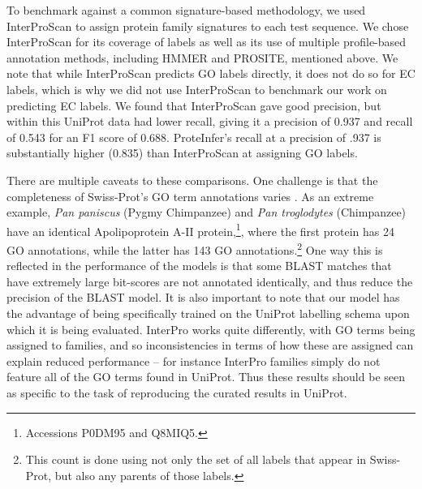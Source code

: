 \DIFaddend To benchmark against a common signature-based methodology, we used InterProScan to assign protein family signatures to each test sequence. We chose InterProScan for its coverage of labels as well as its use of multiple profile-based annotation methods, including HMMER and PROSITE, mentioned above. We note that while InterProScan predicts GO labels directly, it does not do so for EC labels, which is why we did not use InterProScan to benchmark our work on predicting EC labels. We found that InterProScan gave good precision, but within this UniProt data had lower recall, giving it a precision of 0.937 and recall of 0.543 for an F1 score of 0.688. ProteInfer's recall at a precision of .937 is substantially higher (0.835) than InterProScan at assigning GO labels.  

There are multiple caveats to these comparisons. One challenge is that the completeness of Swiss-Prot's GO term annotations varies \cite{jiang2014impact}. As an extreme example, \textit{Pan paniscus} (Pygmy Chimpanzee) and \textit{Pan troglodytes} (Chimpanzee) have an identical Apolipoprotein A-II protein,\footnote{Accessions P0DM95 and Q8MIQ5.}, where the first protein has 24 GO annotations, while the latter has 143 GO annotations.\footnote{This count is done using not only the set of all labels that appear in Swiss-Prot, but also any parents of those labels.} One way this is reflected in the performance of the models is that some BLAST matches that have extremely large bit-scores are not annotated identically, and thus reduce the precision of the BLAST model. It is also important to note that our model has the advantage of being specifically trained on the UniProt labelling schema upon which it is being evaluated. InterPro works quite differently, with GO terms being assigned to families, and so inconsistencies in terms of how these are assigned can explain reduced performance -- for instance InterPro families simply do not feature all of the GO terms found in UniProt. Thus these results should be seen as specific to the task of reproducing the curated results in UniProt.


\DIFaddbegin {}


